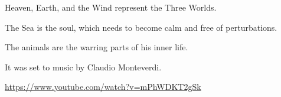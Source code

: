 \begin{quotex}
Heaven, Earth, and the Wind represent the Three Worlds.

The Sea is the soul, which needs to become calm and free of perturbations.

The animals are the warring parts of his inner life.

It was set to music by Claudio Monteverdi.
\end{quotex}

\url{https://www.youtube.com/watch?v=mPhWDKT2gSk} 


